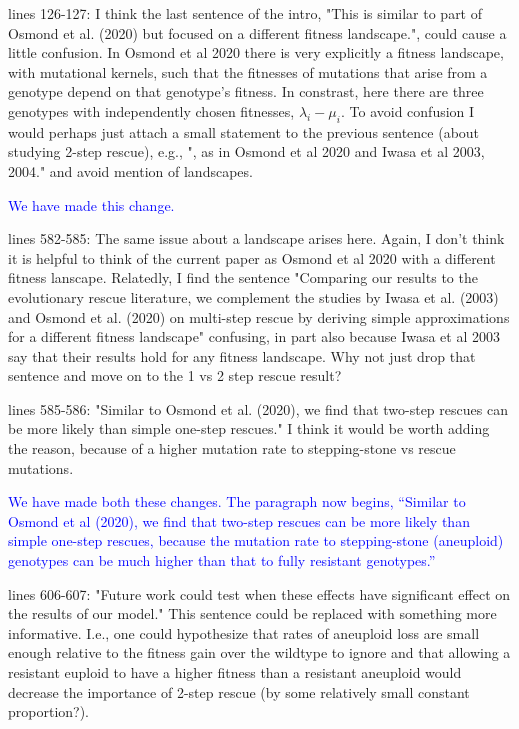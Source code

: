 \documentclass[12pt]{extarticle}
\begin{document}
lines 126-127: I think the last sentence of the intro, "This is similar to part of Osmond et al. (2020) but focused on a different fitness landscape.", could cause a little confusion. In Osmond et al 2020 there is very explicitly a fitness landscape, with mutational kernels, such that the fitnesses of mutations that arise from a genotype depend on that genotype's fitness. In constrast, here there are three genotypes with independently chosen fitnesses, $\lambda_i - \mu_i$. To avoid confusion I would perhaps just attach a small statement to the previous sentence (about studying 2-step rescue), e.g., ", as in Osmond et al 2020 and Iwasa et al 2003, 2004." and avoid mention of landscapes.

\textcolor{blue}{We have made this change.}

lines 582-585: The same issue about a landscape arises here. Again, I don't think it is helpful to think of the current paper as Osmond et al 2020 with a different fitness lanscape. Relatedly, I find the sentence "Comparing our results to the evolutionary rescue literature, we complement the studies by Iwasa et al. (2003) and Osmond et al. (2020) on multi-step rescue by deriving simple approximations for a different fitness landscape" confusing, in part also because Iwasa et al 2003 say that their results hold for any fitness landscape. Why not just drop that sentence and move on to the 1 vs 2 step rescue result?

lines 585-586: "Similar to Osmond et al. (2020), we find that two-step rescues can be more likely than simple one-step rescues." I think it would be worth adding the reason, because of a higher mutation rate to stepping-stone vs rescue mutations.

\textcolor{blue}{We have made both these changes. The paragraph now begins, ``Similar to Osmond et al (2020), we find that two-step rescues can be more likely than simple one-step rescues, because the mutation rate to stepping-stone (aneuploid) genotypes can be much higher than that to fully resistant genotypes.''}

lines 606-607: "Future work could test when these effects have significant effect on the results of our model." This sentence could be replaced with something more informative. I.e., one could hypothesize that rates of aneuploid loss are small enough relative to the fitness gain over the wildtype to ignore and that allowing a resistant euploid to have a higher fitness than a resistant aneuploid would decrease the importance of 2-step rescue (by some relatively small constant proportion?).
\end{document}
